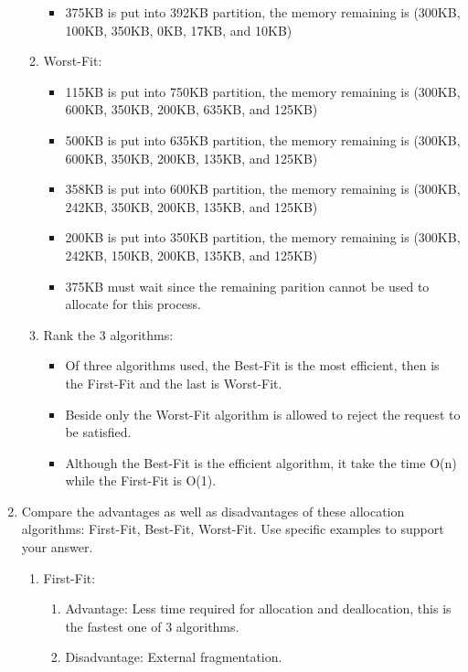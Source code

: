 \documentclass[a4paper, 11pt]{article}
\begin{document}
\begin{enumerate}
\begin{enumerate}
\begin{itemize}
            \item 375KB is put into 392KB partition, the memory remaining is (300KB, 100KB, 350KB, 0KB, 17KB, and 10KB)
        \end{itemize}
        \item Worst-Fit:
        \begin{itemize}
            \item 115KB is put into 750KB partition, the memory remaining is (300KB, 600KB, 350KB, 200KB, 635KB, and 125KB)
            \item 500KB is put into 635KB partition, the memory remaining is (300KB, 600KB, 350KB, 200KB, 135KB, and 125KB)
            \item 358KB is put into 600KB partition, the memory remaining is (300KB, 242KB, 350KB, 200KB, 135KB, and 125KB)
            \item 200KB is put into 350KB partition, the memory remaining is (300KB, 242KB, 150KB, 200KB, 135KB, and 125KB)
            \item 375KB must wait since the remaining parition cannot be used to allocate for this process.
        \end{itemize}

        \item Rank the  3 algorithms:
        \begin{itemize}
            \item Of three algorithms used, the Best-Fit is the most efficient, then is the First-Fit and the last is Worst-Fit.
            \item Beside only the Worst-Fit algorithm is allowed to reject the request to be satisfied.
            \item Although the Best-Fit is the efficient algorithm, it take the time O(n) while the First-Fit is O(1).
        \end{itemize}
    \end{enumerate}
    \item  Compare the advantages as well as disadvantages of these allocation algorithms: First-Fit, Best-Fit, Worst-Fit. Use specific examples to support your answer.
    \begin{enumerate}
        \item First-Fit: 
        \begin{enumerate}
            \item Advantage: Less time required for allocation and deallocation, this is the fastest one of 3 algorithms.
            \item Disadvantage: External fragmentation.
        \end{enumerate}
            

\end{enumerate}
\end{enumerate}
\end{document}
